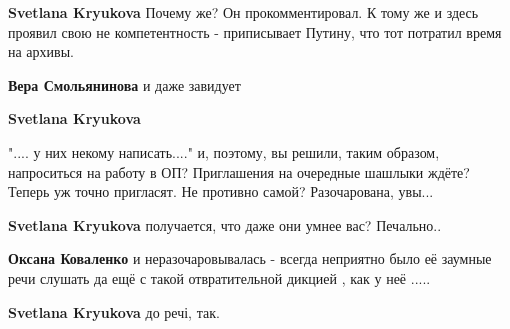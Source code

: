 \begin{itemize}
\begin{itemize}
\textbf{Svetlana Kryukova}
Почему же? Он прокомментировал. К тому же и здесь проявил свою не
компетентность - приписывает Путину, что тот потратил время на архивы.

 
\textbf{Вера Смольянинова} и даже завидует

 
\textbf{Svetlana Kryukova} 

".... у них некому написать...." и, поэтому, вы решили, таким образом,
напроситься на работу в ОП? Приглашения на очередные шашлыки ждёте? Теперь уж
точно пригласят. Не противно самой? Разочарована, увы...

 
\textbf{Svetlana Kryukova} получается, что даже они умнее вас? Печально..

 
\textbf{Оксана Коваленко} и неразочаровывалась - всегда неприятно было её заумные речи слушать да ещё с такой отвратительной дикцией , как у неё .....

 
\textbf{Svetlana Kryukova} до речі, так.

\end{itemize}

 


\end{itemize}
